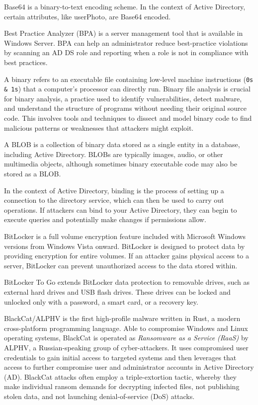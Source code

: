  Base64 is a binary-to-text encoding scheme. In the context of Active Directory, certain attributes, like userPhoto, are Base64 encoded.

 Best Practice Analyzer (BPA) is a server management tool that is available in Windows Server. BPA can help an administrator reduce best-practice violations by scanning an AD DS role and reporting when a role is not in compliance with best practices.

 A binary refers to an executable file containing low-level machine instructions (\texttt{0s \& 1s}) that a computer's processor can directly run. Binary file analysis is crucial for binary analysis, a practice used to identify vulnerabilities, detect malware, and understand the structure of programs without needing their original source code. This involves tools and techniques to dissect and model binary code to find malicious patterns or weaknesses that attackers might exploit.

 A BLOB is a collection of binary data stored as a single entity in a database, including Active Directory. BLOBs are typically images, audio, or other multimedia objects, although sometimes binary executable code may also be stored as a BLOB.

 In the context of Active Directory, binding is the process of setting up a connection to the directory service, which can then be used to carry out operations. If attackers can bind to your Active Directory, they can begin to execute queries and potentially make changes if permissions allow.

 BitLocker is a full volume encryption feature included with Microsoft Windows versions from Windows Vista onward. BitLocker is designed to protect data by providing encryption for entire volumes. If an attacker gains physical access to a server, BitLocker can prevent unauthorized access to the data stored within.

 BitLocker To Go extends BitLocker data protection to removable drives, such as external hard drives and USB flash drives. These drives can be locked and unlocked only with a password, a smart card, or a recovery key.

 BlackCat/ALPHV is the first high-profile malware written in Rust, a modern cross-platform programming language. Able to compromise Windows and Linux operating systems, BlackCat is operated as \textit{Ransomware as a Service (RaaS)} by ALPHV, a Russian-speaking group of cyber-attackers. It uses compromised user credentials to gain initial access to targeted systems and then leverages that access to further compromise user and administrator accounts in Active Directory (AD). BlackCat attacks often employ a triple-extortion tactic, whereby they make individual ransom demands for decrypting infected files, not publishing stolen data, and not launching denial-of-service (DoS) attacks.


